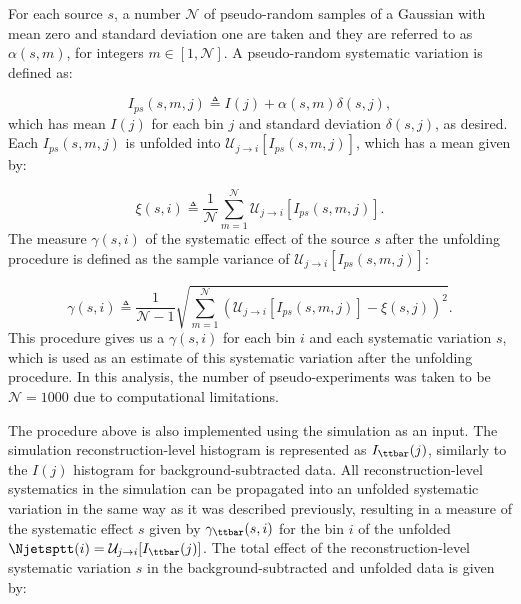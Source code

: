 For each source $s$, a number $\mathcal{N}$ of pseudo-random samples of a Gaussian with mean zero and standard deviation one are taken and they are referred to as
$\alpha(s, m)$, for integers $m \in [1,\mathcal{N}]$. A pseudo-random systematic variation is defined as:

\begin{equation}
\displaystyle
I_{ps}(s, m, j) \triangleq I(j) + \alpha(s, m) \delta(s, j),
\label{eq:ttjets_unfold_pseudosyst}
\end{equation}
which has mean
$I(j)$ for each bin $j$ and standard deviation $\delta(s, j)$, as desired.
Each $I_{ps}(s, m, j)$ is unfolded into $\mathcal{U}_{j \rightarrow i}[I_{ps}(s, m, j)]$, which has a mean given by:

\begin{equation}
\displaystyle
\xi(s, i) \triangleq \frac{1}{\mathcal{N}} \sum_{m=1}^{\mathcal{N}} \mathcal{U}_{j \rightarrow i}[I_{ps}(s, m, j)].
\label{eq:ttjets_unfold_mean}
\end{equation}
The measure $\gamma(s, i)$
of the systematic effect of the source $s$ after the unfolding procedure is defined as the sample variance of $\mathcal{U}_{j \rightarrow i}[I_{ps}(s, m, j)]$:

\begin{equation}
\displaystyle
\gamma(s, i) \triangleq \frac{1}{\mathcal{N} - 1} \sqrt{\sum_{m = 1}^{\mathcal{N}} (\mathcal{U}_{j \rightarrow i}[I_{ps}(s, m, j)] - \xi(s, j))^2}.
\label{eq:ttjets_unfold_unc}
\end{equation}
This procedure gives us a $\gamma(s, i)$ for each bin $i$ and each systematic variation $s$, which is used as an estimate of this systematic variation after
the unfolding procedure. In this analysis, the number of pseudo-experiments was taken to be $\mathcal{N} = 1000$ due to computational limitations.

The procedure above is also implemented using the \ttbar simulation as an input.
The \ttbar simulation reconstruction-level histogram is represented as
$I_{\ttbar}(j)$, similarly to the $I(j)$ histogram for
background-subtracted data. All reconstruction-level systematics
in the \ttbar simulation can be propagated into an unfolded systematic
variation in the same way as it was described previously, resulting
in a measure of the systematic effect $s$ given by $\gamma_{\ttbar}(s, i)$
for the bin $i$ of the unfolded \ttbar $\Njetsptt(i) = \mathcal{U}_{j\rightarrow i}[I_{\ttbar}(j)]$.
The total effect of the reconstruction-level
systematic variation $s$ in the background-subtracted
and unfolded data is given by:

